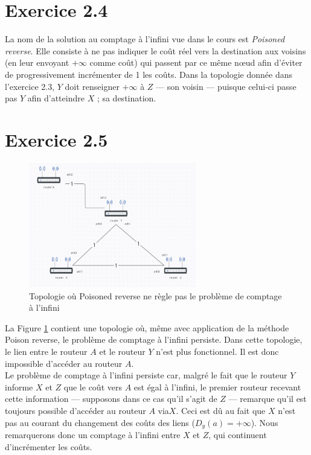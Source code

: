 \documentclass[11pt]{article}
\begin{document}
\section{Exercice 2.4}
La nom de la solution au comptage à l'infini vue dans le cours est \textit{Poisoned reverse}. Elle consiste à ne pas indiquer le coût réel vers la destination aux voisins (en leur envoyant $+\infty$ comme coût) qui passent par ce même nœud afin d'éviter de progressivement incrémenter de 1 les coûts. Dans la topologie donnée dans l'exercice 2.3, $Y$ doit renseigner $+\infty$ à $Z$ --- son voisin --- puisque celui-ci passe pas $Y$ afin d'atteindre $X$ ; sa destination.\\



\section{Exercice 2.5}
\begin{figure} [h!]
\centering
  \includegraphics[width=0.65\textwidth]{../documents/problem-figure.png}
  \caption{Topologie où Poisoned reverse ne règle pas le problème de comptage à l'infini}
   \label{fig:prob-topology}
\end{figure}

La Figure \ref{fig:prob-topology} contient une topologie où, même avec application de la méthode Poison reverse, le problème de comptage à l'infini persiste. Dans cette topologie, le lien entre le routeur $A$ et le routeur $Y$ n'est plus fonctionnel. Il est donc impossible d'accéder au routeur $A$.\\

Le problème de comptage à l'infini persiste car, malgré le fait que le routeur $Y$ informe $X$ et $Z$ que le coût vers $A$ est égal à l'infini, le premier routeur recevant cette information --- supposons dans ce cas qu'il s'agit de $Z$ --- remarque qu'il est toujours possible d'accéder au routeur $A$ via$ X$. Ceci est dû au fait que $X$ n'est pas au courant du changement des coûts des liens ($D_{y}(a)=+\infty$). Nous remarquerons donc un comptage à l'infini entre $X$ et $Z$, qui continuent d'incrémenter les coûts.\\
\end{document}
